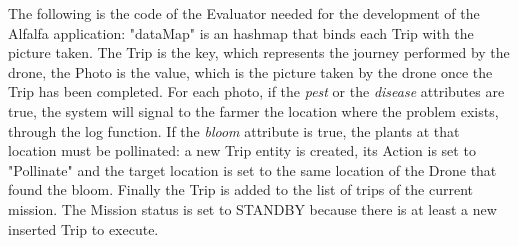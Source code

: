 The following is the code of the Evaluator needed for the development of the Alfalfa\cite{alfalfa} application:
"dataMap" is an hashmap that binds each Trip with the picture taken. 
The Trip is the key, which represents the journey performed by the drone, the Photo is the value, which is the picture taken by the drone once the Trip has been completed.
For each photo, if the \textit{pest} or the \textit{disease} attributes are true, the system will signal to the farmer the location where the problem exists, through the log function.
If the \textit{bloom} attribute is true, the plants at that location must be pollinated: a new Trip entity is created, its Action is set to "Pollinate" and the target location is set to the same location of the Drone that found the bloom.
Finally the Trip is added to the list of trips of the current mission.
The Mission status is set to STANDBY because there is at least a new inserted Trip to execute.
\\


